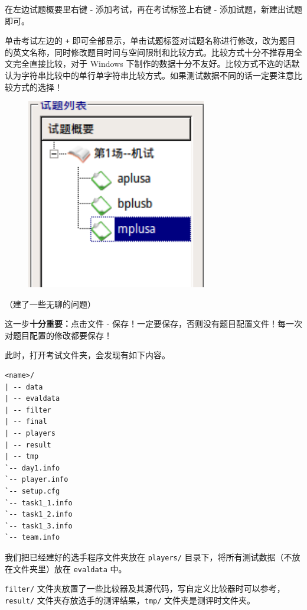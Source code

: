 在左边试题概要里右键 - 添加考试，再在考试标签上右键 - 添加试题，新建出试题即可。

单击考试左边的 \texttt{+} 即可全部显示，单击试题标签对试题名称进行修改，改为题目的英文名称，同时修改题目时间与空间限制和比较方式。比较方式十分不推荐用全文完全直接比较，对于 Windows 下制作的数据十分不友好。比较方式不选的话默认为字符串比较中的单行单字符串比较方式。如果测试数据不同的话一定要注意比较方式的选择！

\begin{figure}[htbp]
\centering
\includegraphics[width=0.7\textwidth]{docs/intro/images/arbiter_problem.png} 

\end{figure}

（建了一些无聊的问题）

这一步\textbf{十分重要：}点击文件 - 保存！一定要保存，否则没有题目配置文件！每一次对题目配置的修改都要保存！

此时，打开考试文件夹，会发现有如下内容。

\begin{verbatim}
<name>/
| -- data
| -- evaldata
| -- filter
| -- final
| -- players
| -- result
| -- tmp
`-- day1.info
`-- player.info
`-- setup.cfg
`-- task1_1.info
`-- task1_2.info
`-- task1_3.info
`-- team.info
\end{verbatim}

我们把已经建好的选手程序文件夹放在 \texttt{players/} 目录下，将所有测试数据（不放在文件夹里）放在 \texttt{evaldata} 中。

\texttt{filter/} 文件夹放置了一些比较器及其源代码，写自定义比较器时可以参考，\texttt{result/} 文件夹存放选手的测评结果，\texttt{tmp/} 文件夹是测评时文件夹。

